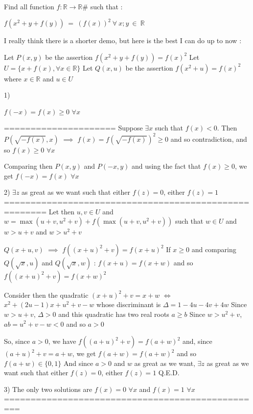 \begin{solution}
	\begin{tcolorbox}\begin{italicized}Find all function $ f : \mathbb{R} \to \mathbb{R} \#$ such that :

   $ f( x^2 + y + f(y)) \ = \ (f(x))^2 \ \forall \ x ;y \ \in \ \mathbb{R}$\end{italicized}\end{tcolorbox}

I really think there is a shorter demo, but here is the best I can do up to now :

Let $ P(x,y)$ be the assertion $ f(x^2+y+f(y))=f(x)^2$
Let $ U=\{x+f(x),\forall x\in\mathbb R\}$
Let $ Q(x,u)$ be the assertion $ f(x^2+u)=f(x)^2$ where $ x\in\mathbb R$ and $ u\in U$

1) \begin{bolded}$ f(-x)=f(x)\geq 0$ $ \forall x$\end{bolded}
=====================
Suppose $ \exists x$ such that $ f(x)<0$. Then $ P(\sqrt{-f(x)},x)$ $ \implies$ $ f(x)=f(\sqrt{-f(x)})^2\geq 0$ and so contradiction, and so $ f(x)\geq 0$ $ \forall x$

Comparing then $ P(x,y)$ and $ P(-x,y)$ and using the fact that $ f(x)\geq 0$, we get $ f(-x)=f(x)$ $ \forall x$

2) $ \exists z$ as great as we want such that either $ f(z)=0$, either $ f(z)=1$
======================================================
Let then $ u,v\in U$ and $ w=\max(u+v,u^2+v)+f(\max(u+v,u^2+v))$ such that $ w\in U$ and $ w>u+v$ and $ w>u^2+v$

$ Q(x+u,v)$ $ \implies$ $ f((x+u)^2+v)=f(x+u)^2$
If $ x\geq 0$ and comparing $ Q(\sqrt x,u)$ and $ Q(\sqrt x,w)$ : $ f(x+u)=f(x+w)$ and so $ f((x+u)^2+v)=f(x+w)^2$

Consider then the quadratic $ (x+u)^2+v=x+w$ $ \iff$ $ x^2+(2u-1)x+u^2+v-w$ whose discriminant is $ \Delta=1-4u-4v+4w$
Since $ w>u+v$, $ \Delta>0$ and this quadratic has two real roots $ a\geq b$
Since $ w>u^2+v$, $ ab=u^2+v-w<0$ and so $ a>0$

So, since $ a>0$, we have $ f((a+u)^2+v)=f(a+w)^2$ and, since $ (a+u)^2+v=a+w$, we get $ f(a+w)=f(a+w)^2$ and so $ f(a+w)
\in\{0,1\}$
And since $ a>0$ and $ w$ as great as we want, $ \exists z$ as great as we want such that either $ f(z)=0$, either $ f(z)=1$
Q.E.D.

3) The only two solutions are $ f(x)=0$ $ \forall x$ and $ f(x)=1$ $ \forall x$
=================================================


\end{solution}
